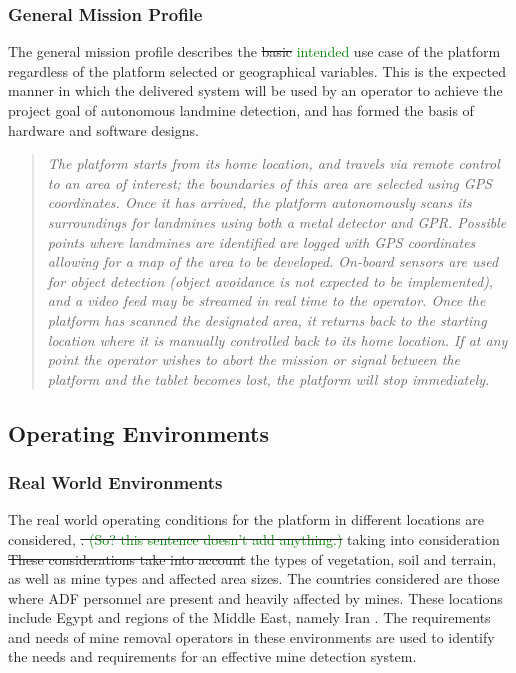\documentclass[main.tex]{subfiles}
\begin{document}
\subsubsection{General Mission Profile}
The general mission profile describes the \sout{basic} \textcolor{green}{intended} use case of the platform regardless of the platform selected or geographical variables. This is the expected manner in which the delivered system will be used by an operator to achieve the project goal of autonomous landmine detection, and has formed the basis of hardware and software designs.
\begin{quote}\textit{The platform starts from its home location, and travels via remote control to an area of interest; the boundaries of this area are selected using GPS coordinates. Once it has arrived, the platform autonomously scans its surroundings for landmines using both a metal detector and GPR. Possible points where landmines are identified are logged with GPS coordinates allowing for a map of the area to be developed. On-board sensors are used for object detection (object avoidance is not expected to be implemented), and a video feed may be streamed in real time to the operator. Once the platform has scanned the designated area, it returns back to the starting location where it is manually controlled back to its home location. If at any point the operator wishes to abort the mission or signal between the platform and the tablet becomes lost, the platform will stop immediately.}
\end{quote}
\subsection{Operating Environments}
\subsubsection{Real World Environments}


The real world operating conditions for the platform in different locations are considered, \sout{. \textcolor{green}{(So? this sentence doesn't add anything.)}} taking into consideration \sout{These considerations take into account} the types of vegetation, soil and terrain, as well as mine types and affected area sizes. The countries considered are those where ADF personnel are present and heavily affected by mines. These locations include Egypt and regions of the Middle East, namely Iran \parencite{AustralianGovernment2016}. The requirements and needs of mine removal operators in these environments are used to identify the needs and requirements for an effective mine detection system.
\end{document}
